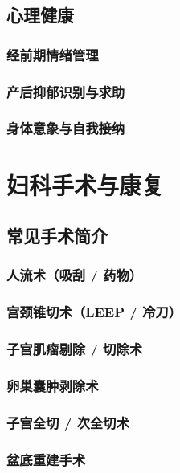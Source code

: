 \begin{enumerate}
\section{心理健康}
\subsection{经前期情绪管理}
\subsection{产后抑郁识别与求助}
\subsection{身体意象与自我接纳}

\chapter{妇科手术与康复}

\section{常见手术简介}
\subsection{人流术（吸刮 / 药物）}
\subsection{宫颈锥切术（LEEP / 冷刀）}
\subsection{子宫肌瘤剔除 / 切除术}
\subsection{卵巢囊肿剥除术}
\subsection{子宫全切 / 次全切术}
\subsection{盆底重建手术}


\end{enumerate}

